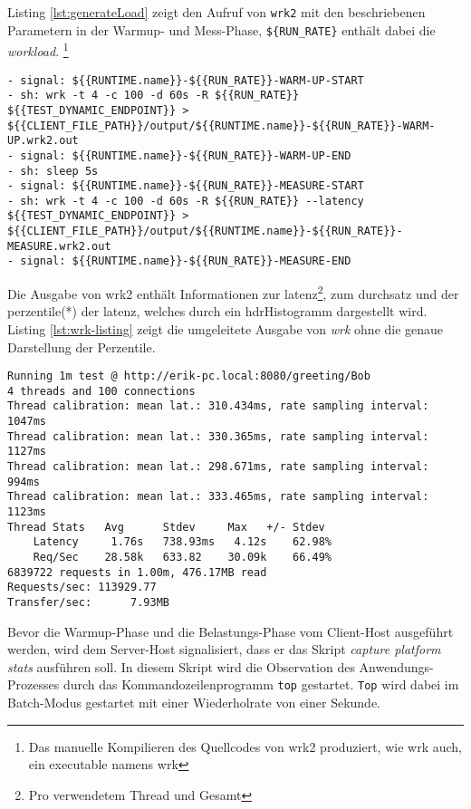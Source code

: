 Listing \ref*{lst:generateLoad} zeigt den Aufruf von \verb|wrk2| mit den beschriebenen Parametern in der Warmup- und Mess-Phase,
\verb|${RUN_RATE}| enthält dabei die \textit{workload}.
\footnote{Das manuelle Kompilieren des Quellcodes von wrk2 produziert, wie wrk auch, ein executable namens wrk}

\begin{lstlisting}[caption=Auszug des qDup Skripts generate load, captionpos=b, label=lst:generateLoad]
- signal: ${{RUNTIME.name}}-${{RUN_RATE}}-WARM-UP-START
- sh: wrk -t 4 -c 100 -d 60s -R ${{RUN_RATE}} ${{TEST_DYNAMIC_ENDPOINT}} > ${{CLIENT_FILE_PATH}}/output/${{RUNTIME.name}}-${{RUN_RATE}}-WARM-UP.wrk2.out
- signal: ${{RUNTIME.name}}-${{RUN_RATE}}-WARM-UP-END
- sh: sleep 5s
- signal: ${{RUNTIME.name}}-${{RUN_RATE}}-MEASURE-START
- sh: wrk -t 4 -c 100 -d 60s -R ${{RUN_RATE}} --latency ${{TEST_DYNAMIC_ENDPOINT}} > ${{CLIENT_FILE_PATH}}/output/${{RUNTIME.name}}-${{RUN_RATE}}-MEASURE.wrk2.out
- signal: ${{RUNTIME.name}}-${{RUN_RATE}}-MEASURE-END
   \end{lstlisting}

Die Ausgabe von wrk2 enthält Informationen zur \Gls{latenz}\footnote{Pro verwendetem Thread und Gesamt},
zum \Gls{durchsatz} und der \Gls{perzentile}(*) der \Gls{latenz}, welches durch ein \Gls{hdrHistogramm} dargestellt wird.
Listing \ref*{lst:wrk-listing} zeigt die umgeleitete Ausgabe von \textit{wrk} ohne die genaue Darstellung der Perzentile.

\begin{lstlisting}[caption=Beispiel für Ausgabe von wrk,captionpos=b, label=lst:wrk-listing]
Running 1m test @ http://erik-pc.local:8080/greeting/Bob
4 threads and 100 connections
Thread calibration: mean lat.: 310.434ms, rate sampling interval: 1047ms
Thread calibration: mean lat.: 330.365ms, rate sampling interval: 1127ms
Thread calibration: mean lat.: 298.671ms, rate sampling interval: 994ms
Thread calibration: mean lat.: 333.465ms, rate sampling interval: 1123ms
Thread Stats   Avg      Stdev     Max   +/- Stdev
	Latency     1.76s   738.93ms   4.12s    62.98%
	Req/Sec    28.58k   633.82    30.09k    66.49%
6839722 requests in 1.00m, 476.17MB read
Requests/sec: 113929.77
Transfer/sec:      7.93MB
\end{lstlisting}

Bevor die Warmup-Phase und die Belastungs-Phase vom Client-Host ausgeführt werden, wird dem Server-Host signalisiert, dass
er das Skript \textit{capture platform stats} ausführen soll.
In diesem Skript wird die Observation des Anwendungs-Prozesses durch das Kommandozeilenprogramm \verb|top| gestartet.
\verb|Top| wird dabei im Batch-Modus gestartet mit einer Wiederholrate von einer Sekunde.

